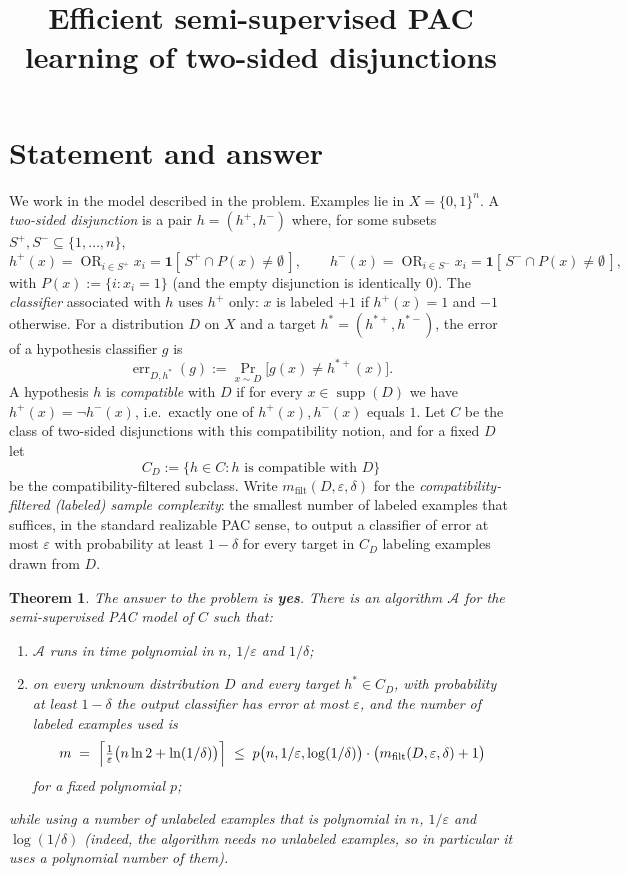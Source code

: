 \documentclass{amsart}
\newtheorem{theorem}{Theorem}
\theoremstyle{definition}
\DeclareMathOperator{\supp}{supp}
\DeclareMathOperator{\err}{err}
\DeclareMathOperator*{\OR}{OR}
\newcommand{\eps}{\varepsilon}
\newcommand{\X}{\{0,1\}^n}
\begin{document}
\title{Efficient semi-supervised PAC learning of two-sided disjunctions}
\maketitle

\section{Statement and answer}

We work in the model described in the problem. Examples lie in $X=\X$. A
\emph{two-sided disjunction} is a pair $h=(h^+,h^-)$ where, for some subsets
$S^+,S^-\subseteq\{1,\dots,n\}$,
\[
  h^+(x)=\OR_{i\in S^+} x_i=\mathbf 1[\,S^+\cap P(x)\neq\emptyset\,],\qquad
  h^-(x)=\OR_{i\in S^-} x_i=\mathbf 1[\,S^-\cap P(x)\neq\emptyset\,],
\]
with $P(x):=\{i:x_i=1\}$ (and the empty disjunction is identically $0$). The
\emph{classifier} associated with $h$ uses $h^+$ only: $x$ is labeled $+1$ if
$h^+(x)=1$ and $-1$ otherwise. For a distribution $D$ on $X$ and a target
$h^\ast=(h^{\ast+},h^{\ast-})$, the error of a hypothesis classifier $g$ is
\[
  \err_{D,h^\ast}(g):=\Pr_{x\sim D}\bigl[g(x)\neq h^{\ast+}(x)\bigr].
\]
A hypothesis $h$ is \emph{compatible} with $D$ if for every $x\in\supp(D)$ we
have $h^+(x)=\lnot h^-(x)$, i.e.\ exactly one of $h^+(x),h^-(x)$ equals $1$. Let
$C$ be the class of two-sided disjunctions with this compatibility notion, and
for a fixed $D$ let
\[
  C_D:=\{h\in C: h \text{ is compatible with } D\}
\]
be the compatibility-filtered subclass. Write
$m_{\mathrm{filt}}(D,\eps,\delta)$ for the
\emph{compatibility-filtered (labeled) sample complexity}: the smallest number
of labeled examples that suffices, in the standard realizable PAC sense, to
output a classifier of error at most $\eps$ with probability at least
$1-\delta$ for every target in $C_D$ labeling examples drawn from $D$.

\begin{theorem}\label{thm:main}
The answer to the problem is \textbf{yes}. There is an algorithm
$\mathcal A$ for the semi-supervised PAC model of $C$ such that:
\begin{enumerate}
\item[(a)] $\mathcal A$ runs in time polynomial in $n$, $1/\eps$ and
$1/\delta$;
\item[(b)] on every unknown distribution $D$ and every target
$h^\ast\in C_D$, with probability at least $1-\delta$ the output classifier
has error at most $\eps$, and the number of labeled examples used is
\[
  m \;=\; \Bigl\lceil \tfrac{1}{\eps}\bigl(n\ln 2+\ln(1/\delta)\bigr)\Bigr\rceil
  \;\le\; p\bigl(n,1/\eps,\log(1/\delta)\bigr)\cdot
          \bigl(m_{\mathrm{filt}}(D,\eps,\delta)+1\bigr)
\]
for a fixed polynomial $p$;
\end{enumerate}
while using a number of unlabeled examples that is polynomial in $n$, $1/\eps$
and $\log(1/\delta)$ (indeed, the algorithm needs no unlabeled examples, so in
particular it uses a polynomial number of them).
\end{theorem}
\end{document}
